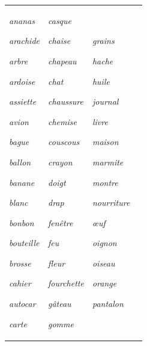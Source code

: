 \documentclass[output=paper,newtxmath,modfonts,nonflat,draftmode]{langsci/langscibook}
\begin{document}
\begin{tabularx}{\textwidth}{XXXX}
\textit{ananas}

\textit{arachide}

\textit{arbre~}

\textit{ardoise}

\textit{assiette} 

\textit{avion} 

\textit{bague}

\textit{ballon}

\textit{banane}

\textit{blanc} 

\textit{bonbon~}

\textit{bouteille}

\textit{brosse} 

\textit{cahier}

\textit{autocar}

\textit{carte} & \textit{casque} 

\textit{chaise}

\textit{chapeau}

\textit{chat}

\textit{chaussure}

\textit{chemise}

\textit{couscous}

\textit{crayon}

\textit{doigt}

\textit{drap} 

\textit{fenêtre} 

\textit{feu}

\textit{fleur} 

\textit{fourchette}

\textit{gâteau}

\textit{gomme} & \textit{grains} 

\textit{hache}

\textit{huile}

\textit{journal}

\textit{livre} 

\textit{maison}

\textit{marmite}

\textit{montre} 

\textit{nourriture}

\textit{œuf}

\textit{oignon}

\textit{oiseau}

\textit{orange}

\textit{pantalon}


\end{tabularx}
\end{document}
